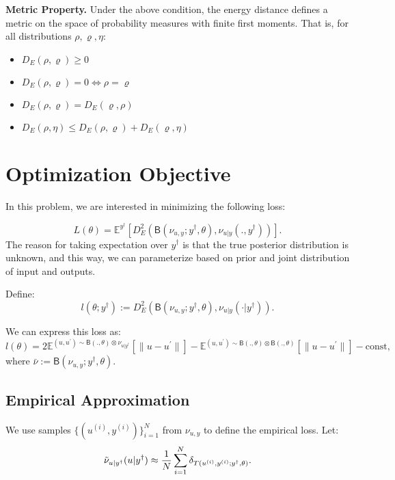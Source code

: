 \documentclass[twoside,11pt]{article}
\begin{document}
\medskip

\textbf{Metric Property.} Under the above condition, the energy distance defines a metric on the space of probability measures with finite first moments. That is, for all distributions \(\rho, \varrho, \eta\):
\begin{itemize}
    \item \(D_E(\rho, \varrho) \geq 0\)
    \item \(D_E(\rho, \varrho) = 0 \iff \rho = \varrho\)
    \item \(D_E(\rho, \varrho) = D_E(\varrho, \rho)\)
    \item \(D_E(\rho, \eta) \leq D_E(\rho, \varrho) + D_E(\varrho, \eta)\)
\end{itemize}



\section*{Optimization Objective}


In this problem, we are interested in minimizing the following loss:




\begin{equation}
    L(\theta)=\mathbb{E}^{y^\dag}[{D}^2_{E}(\mathsf{B}(\nu_{u,y};y^\dag,\theta),\nu_{u|y}(.,y^\dag))].
\end{equation}
The reason for taking expectation over $y^\dag$ is that the true posterior distribution is unknown, and this way, we can parameterize based on prior and joint distribution of input and outputs.



Define:
\[
l(\theta; y^\dag) := {D}^2_E(\mathsf{B}(\nu_{u,y}; y^\dag, \theta), \nu_{u|y}(\cdot | y^\dag)).
\]

We can express this loss as:
\[
l(\theta)= 2\mathbb{E}^{(u,u^\prime)\sim \mathsf{B}(.,\theta) \otimes \nu_{u|y^\dag}}[\|u-u^\prime\|]-\mathbb E^{(u,u^\prime)\sim \mathsf{B} (.,\theta) \otimes \mathsf{B}(.,\theta)} [\|u-u^\prime\|]-\text{const},
\]
where \(\bar{\nu} := \mathsf{B}(\nu_{u,y}; y^\dag, \theta)\).



\subsection*{Empirical Approximation}
We use samples \(\{(u^{(i)}, y^{(i)})\}_{i=1}^N\) from \(\nu_{u,y}\) to define the empirical loss. Let:
\[
\Tilde{\nu}_{u|y^\dag}(u|y^\dag) \approx \frac{1}{N} \sum_{i=1}^N \delta_{T(u^{(i)}, y^{(i)}; y^\dag, \theta)}.
\]
\end{document}
